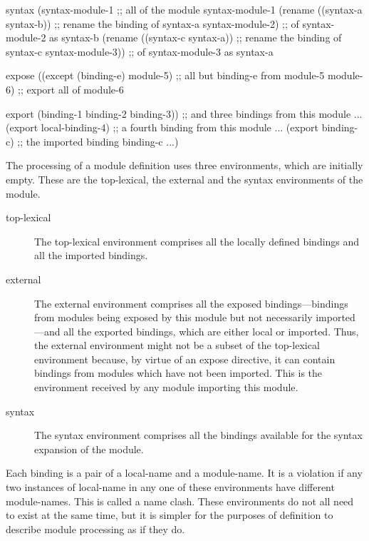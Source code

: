 \begin{optDefinition}
\begin{figure*}[t]
\begin{example}
\begin{center}
\begin{minipage}[t]{\textwidth}
{   syntax
    (syntax-module-1                                 ;; all of the module syntax-module-1
     (rename ((syntax-a syntax-b))                   ;; rename the binding of syntax-a
      syntax-module-2)                               ;; of syntax-module-2 as syntax-b
     (rename ((syntax-c syntax-a))                   ;; rename the binding of syntax-c
      syntax-module-3))                              ;; of syntax-module-3 as syntax-a

   expose
    ((except (binding-e) module-5)                   ;; all but binding-e from module-5
     module-6)                                       ;; export all of module-6

   export
    (binding-1 binding-2 binding-3))                 ;; and three bindings from this module
  ...
  (export local-binding-4)                           ;; a fourth binding from this module
  ...
  (export binding-c)                                 ;; the imported binding binding-c
  ...)
\endsyntax
}
\end{minipage}
\end{center}
\end{example}
\end{figure*}
%
The processing of a module definition uses three environments, which are
initially empty.  These are the top-lexical, the external and the syntax
environments of the module.
%
\begin{description}
    \item[top-lexical] The top-lexical environment comprises all the locally
    defined bindings and all the imported bindings.

    \item[external] The external environment comprises all the exposed
    bindings---bindings from modules being exposed by this module but not
    necessarily imported---and all the exported bindings, which are either local
    or imported.  Thus, the external environment might not be a subset of the
    top-lexical environment because, by virtue of an expose directive, it can
    contain bindings from modules which have not been imported.  This is the
    environment received by any module importing this module.

    \item[syntax] The syntax environment comprises all the bindings available
    for the syntax expansion of the module.
\end{description}
%
Each binding is a pair of a local-name and a module-name.  It is a violation
if any two instances of local-name in any one of these environments have
different module-names.  This is called a name clash.  These environments do not
all need to exist at the same time, but it is simpler for the purposes of
definition to describe module processing as if they do.
\end{optDefinition}

